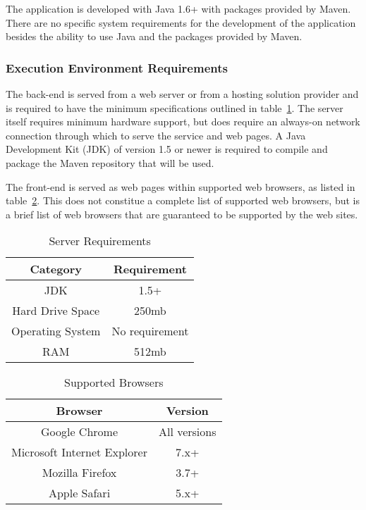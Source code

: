 \documentclass{article}
\begin{document}
The application is developed with Java 1.6+ with packages provided by
Maven.  There are no specific system requirements for the development of
the application besides the ability to use Java and the packages provided
by Maven.

\subsubsection{Execution Environment Requirements}

The back-end is served from a web server or from a hosting solution provider and is
required to have the minimum specifications outlined in table~\ref{server}.  The
server itself requires minimum hardware support, but does require an always-on
network connection through which to serve the service and web pages.  A Java
Development Kit (JDK) of version 1.5 or newer is required to compile and package
the Maven repository that will be used.

The front-end is served as web pages within supported web browsers, as listed in
table~\ref{browsers}.  This does not constitue a complete list of supported web
browsers, but is a brief list of web browsers that are guaranteed to be supported
by the web sites.

\begin{table}
    \centering
    \begin{tabular}{|c|c|}\hline
        Category & Requirement \\\hline\hline
        JDK & 1.5+ \\\hline
        Hard Drive Space & 250mb \\\hline
        Operating System & No requirement \\\hline
        RAM & 512mb \\\hline
    \end{tabular}
    \caption{Server Requirements}
    \label{server}
\end{table}

\begin{table}
    \centering
    \begin{tabular}{|c|c|}\hline
        Browser & Version \\\hline\hline
        Google Chrome & All versions  \\\hline
        Microsoft Internet Explorer & 7.x+ \\\hline
        Mozilla Firefox & 3.7+ \\\hline
        Apple Safari & 5.x+ \\\hline
    \end{tabular}
    \caption{Supported Browsers}
    \label{browsers}
\end{table}
\end{document}
